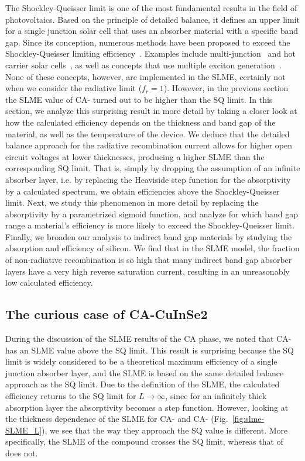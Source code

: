 \begin{refsection}
The Shockley-Queisser limit is one of the most fundamental results in the field of photovoltaics. Based on the principle of detailed balance, it defines an upper limit for a single junction solar cell that uses an absorber material with a specific band gap. Since its conception, numerous methods have been proposed to exceed the Shockley-Queisser limiting efficiency~\cite{Nelson2013}. Examples include multi-junction~\cite{Shah2004, Heremans2009} and hot carrier solar cells~\cite{Konig2010}, as well as concepts that use multiple exciton generation~\cite{Hanna2006}. None of these concepts, however, are implemented in the SLME, certainly not when we consider the radiative limit ($f_r = 1$). However, in the previous section the SLME value of CA- turned out to be higher than the SQ limit. In this section, we analyze this surprising result in more detail by taking a closer look at how the calculated efficiency depends on the thickness and band gap of the material, as well as the temperature of the device. We deduce that the detailed balance approach for the radiative recombination current allows for higher open circuit voltages at lower thicknesses, producing a higher SLME than the corresponding SQ limit. That is, simply by dropping the assumption of an infinite absorber layer, i.e. by replacing the Heaviside step function for the absorptivity by a calculated spectrum, we obtain efficiencies above the Shockley-Queisser limit. Next, we study this phenomenon in more detail by replacing the absorptivity by a parametrized sigmoid function, and analyze for which band gap range a material's efficiency is more likely to exceed the Shockley-Queisser limit. Finally, we broaden our analysis to indirect band gap materials by studying the absorption and efficiency of silicon. We find that in the SLME model, the fraction of non-radiative recombination is so high that many indirect band gap absorber layers have a very high reverse saturation current, resulting in an unreasonably low calculated efficiency. 

\subsection{The curious case of CA-CuInSe2} \label{sec:slme-CuInSe2}

During the discussion of the SLME results of the CA phase, we noted that \mbox{CA-} has an SLME value above the SQ limit. This result is surprising because the SQ limit is widely considered to be a theoretical maximum efficiency of a single junction absorber layer, and the SLME is based on the same detailed balance approach as the SQ limit. Due to the definition of the SLME, the calculated efficiency returns to the SQ limit for \mbox{$L \rightarrow \infty$}, since for an infinitely thick absorption layer the absorptivity becomes a step function. However, looking at the thickness dependence of the SLME for \mbox{CA-} and \mbox{CA-} (Fig.~\ref{fig:slme-SLME_L}), we see that the way they approach the SQ value is different. More specifically, the SLME of the compound  crosses the SQ limit, whereas that of  does not.


\end{refsection}
